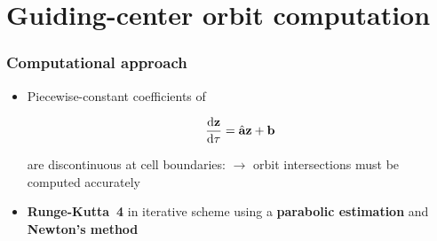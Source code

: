 \documentclass{beamer}
\newcommand{\be}[1]{\begin{equation} \label{#1}}
\newcommand{\ee}{\end{equation}}
\newcommand{\rd}{{\rm d}}
\begin{document}
\section{Guiding-center orbit computation}
\begin{frame}
\frametitle{Computational approach}
\vspace{-0.5cm}
\begin{itemize}
	\item Piecewise-constant coefficients of 
	\setcounter{equation}{2}

\begin{equation}
\label{eq:EoM}
\frac{\rd \textbf{z}}{\rd \tau} = \hat{\textbf{a}}\textbf{z} + \textbf{b}
\end{equation}


	are discontinuous at cell boundaries: \newline$\rightarrow$ orbit intersections must be computed accurately
	\vspace{0.3cm}
	\item \textbf{Runge-Kutta~4} in iterative scheme using a \textbf{parabolic estimation} and \textbf{Newton's method}
\end{itemize}
\end{frame}
\end{document}
